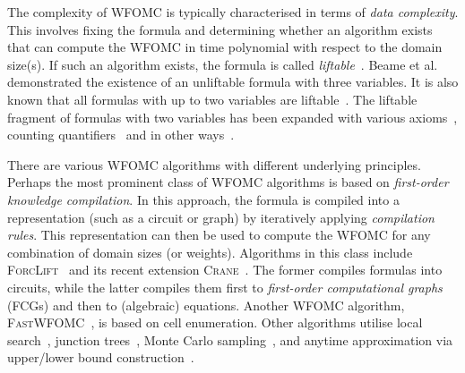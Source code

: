 \documentclass{article}
\theoremstyle{remark}
\begin{document}

The complexity of WFOMC is typically characterised in terms of \emph{data
  complexity}. This involves fixing the formula and determining whether an
algorithm exists that can compute the WFOMC in time polynomial with respect to
the domain size(s). If such an algorithm exists, the formula is called
\emph{liftable}~\cite{DBLP:conf/starai/JaegerB12}. Beame et
al.~ demonstrated the existence of an
unliftable formula with three variables. It is also known that all formulas with
up to two variables are
liftable~\cite{DBLP:conf/nips/Broeck11,DBLP:conf/kr/BroeckMD14}. The liftable
fragment of formulas with two variables has been expanded with various
axioms~\cite{DBLP:conf/aaai/TothK23,DBLP:journals/ai/BremenK23}, counting
quantifiers~\cite{DBLP:journals/jair/Kuzelka21} and in other
ways~\cite{DBLP:conf/nips/KazemiKBP16}.


There are various WFOMC algorithms with different underlying principles. Perhaps
the most prominent class of WFOMC algorithms is based on \emph{first-order
  knowledge compilation}. In this approach, the formula is compiled into a
representation (such as a circuit or graph) by iteratively applying
\emph{compilation rules}. This representation can then be used to compute the
WFOMC for any combination of domain sizes (or weights). Algorithms in this class
include \textsc{ForcLift}~\cite{DBLP:conf/ijcai/BroeckTMDR11} and its recent
extension \textsc{Crane}~\cite{DBLP:conf/kr/DilkasB23}. The former compiles
formulas into circuits, while the latter compiles them first to
\emph{first-order computational graphs} (FCGs) and then to (algebraic)
equations. Another WFOMC algorithm,
\textsc{FastWFOMC}~\cite{DBLP:conf/uai/BremenK21}, is based on cell enumeration.
Other algorithms utilise local search~\cite{DBLP:journals/pvldb/NiuRDS11},
junction trees~\cite{DBLP:conf/aaai/VenugopalSG15}, Monte Carlo
sampling~\cite{DBLP:journals/cacm/GogateD16}, and anytime approximation via
upper/lower bound construction~\cite{DBLP:conf/ijcai/BremenK20}.

\end{document}
